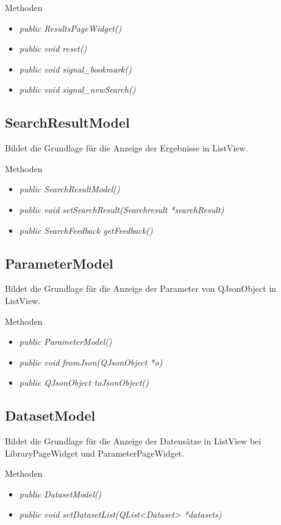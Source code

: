 Methoden
\begin{itemize}
	\item\textit{public ResultsPageWidget()}
	\item\textit{public void reset()}
	\item\textit{public void signal\_bookmark()}
	\item\textit{public void signal\_newSearch()}
\end{itemize}

\subsection*{SearchResultModel}
Bildet die Grundlage für die Anzeige der Ergebnisse in ListView.

Methoden
\begin{itemize}
	\item\textit{public SearchResultModel()}
	\item\textit{public void setSearchResult(Searchresult *searchResult)}
	\item\textit{public SearchFeedback getFeedback()}
\end{itemize}

\subsection*{ParameterModel}
Bildet die Grundlage für die Anzeige der Parameter von QJsonObject in ListView.

Methoden
\begin{itemize}
	\item\textit{public ParameterModel()}
	\item\textit{public void fromJson(QJsonObject *o)}
	\item\textit{public QJsonObject toJsonObject()}
\end{itemize}

\subsection*{DatasetModel}
Bildet die Grundlage für die Anzeige der Datensätze in ListView bei LibraryPageWidget und ParameterPageWidget.

Methoden
\begin{itemize}
	\item\textit{public DatasetModel()}
	\item\textit{public void setDatasetList(QList<Dataset> *datasets)}
\end{itemize}

